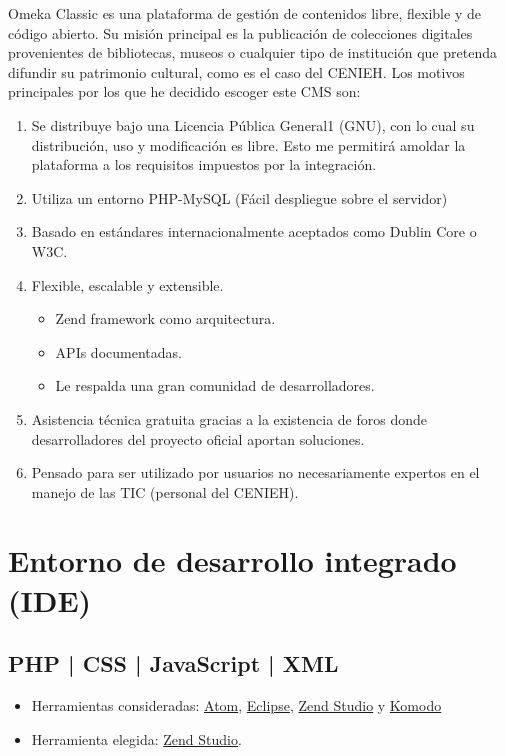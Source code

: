 Omeka Classic es una plataforma de gestión de contenidos libre, flexible y de código abierto. Su misión principal es la publicación de colecciones digitales provenientes de bibliotecas, museos o cualquier tipo de institución que pretenda difundir su patrimonio cultural, como es el caso del CENIEH. Los motivos principales por los que he decidido escoger este CMS son:
\begin{enumerate}
\tightlist
	\item Se distribuye bajo una Licencia Pública General1 (GNU), con lo cual su distribución, uso y modificación es libre. Esto me permitirá amoldar la plataforma a los requisitos impuestos por la integración.
	\item Utiliza un entorno PHP-MySQL (Fácil despliegue sobre el servidor)
	\item Basado en estándares internacionalmente aceptados como Dublin Core o W3C. 
	\item Flexible, escalable y extensible.
	\begin{itemize}
	\tightlist
		\item Zend framework como arquitectura.
		\item APIs documentadas.
		\item Le respalda una gran comunidad de desarrolladores.
	\end{itemize}
	\item Asistencia técnica gratuita gracias a la existencia de foros donde desarrolladores del proyecto oficial aportan soluciones.
	\item Pensado para ser utilizado por usuarios no necesariamente expertos en el manejo de las TIC (personal del CENIEH).
\end{enumerate}

\section{Entorno de desarrollo integrado (IDE)}\label{ide}

\subsection{PHP | CSS | JavaScript | XML}\label{java}

\begin{itemize}
\tightlist
	\item Herramientas consideradas:
  		\href{https://atom.io/}{Atom},
  		\href{https://eclipse.org/}{Eclipse},
  		\href{https://www.zend.com/products/zend-studio}{Zend Studio} y
  		\href{https://www.activestate.com/products/komodo-ide/}{Komodo}  
	\item Herramienta elegida: \href{https://www.zend.com/products/zend-studio}{Zend Studio}.
\end{itemize}

